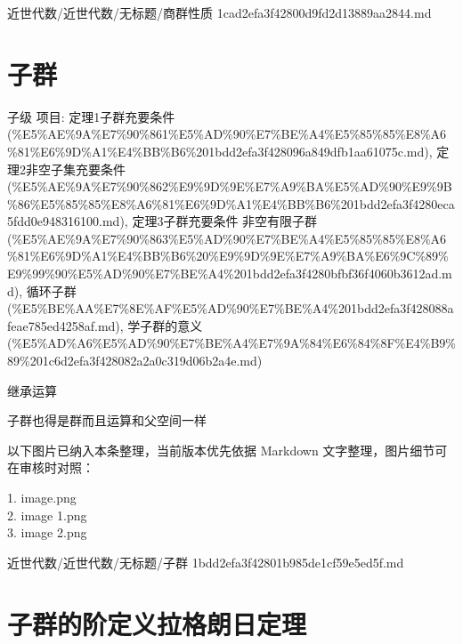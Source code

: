 \begin{note}[来源路径]

近世代数/近世代数/无标题/商群性质 1cad2efa3f42800d9fd2d13889aa2844.md

\end{note}

\section*{子群}

\begin{note}[子群]

子级 项目: 定理1子群充要条件 (\%E5\%AE\%9A\%E7\%90\%861\%E5\%AD\%90\%E7\%BE\%A4\%E5\%85\%85\%E8\%A6\%81\%E6\%9D\%A1\%E4\%BB\%B6\%201bdd2efa3f428096a849dfb1aa61075c.md), 定理2非空子集充要条件 (\%E5\%AE\%9A\%E7\%90\%862\%E9\%9D\%9E\%E7\%A9\%BA\%E5\%AD\%90\%E9\%9B\%86\%E5\%85\%85\%E8\%A6\%81\%E6\%9D\%A1\%E4\%BB\%B6\%201bdd2efa3f4280eca5fdd0e948316100.md), 定理3子群充要条件 非空有限子群 (\%E5\%AE\%9A\%E7\%90\%863\%E5\%AD\%90\%E7\%BE\%A4\%E5\%85\%85\%E8\%A6\%81\%E6\%9D\%A1\%E4\%BB\%B6\%20\%E9\%9D\%9E\%E7\%A9\%BA\%E6\%9C\%89\%E9\%99\%90\%E5\%AD\%90\%E7\%BE\%A4\%201bdd2efa3f4280bfbf36f4060b3612ad.md), 循环子群 (\%E5\%BE\%AA\%E7\%8E\%AF\%E5\%AD\%90\%E7\%BE\%A4\%201bdd2efa3f428088afeae785ed4258af.md), 学子群的意义 (\%E5\%AD\%A6\%E5\%AD\%90\%E7\%BE\%A4\%E7\%9A\%84\%E6\%84\%8F\%E4\%B9\%89\%201c6d2efa3f428082a2a0c319d06b2a4e.md)

继承运算

子群也得是群而且运算和父空间一样

\end{note}

\begin{note}[关联图片]
以下图片已纳入本条整理，当前版本优先依据 Markdown 文字整理，图片细节可在审核时对照：

1. image.png\\
2. image 1.png\\
3. image 2.png\\

\end{note}

\begin{note}[来源路径]

近世代数/近世代数/无标题/子群 1bdd2efa3f42801b985de1cf59e5ed5f.md

\end{note}

\section*{子群的阶定义拉格朗日定理}

